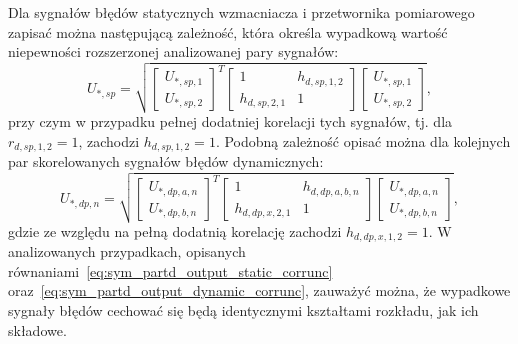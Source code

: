 Dla sygnałów błędów statycznych wzmacniacza i przetwornika pomiarowego zapisać można następującą zależność, która określa wypadkową wartość niepewności rozszerzonej analizowanej pary sygnałów:
\begin{equation}
U_{*,sp} = \sqrt{
\begin{bmatrix}
U_{*,sp,1} \\ U_{*,sp,2}
\end{bmatrix}^{T}
\begin{bmatrix}
1 & h_{d,sp,1,2} \\
h_{d,sp,2,1} & 1
\end{bmatrix}
\begin{bmatrix}
U_{*,sp,1} \\ U_{*,sp,2}
\end{bmatrix}}
\label{eq:sym_partd_output_static_corrunc},
\end{equation}
przy czym w przypadku pełnej dodatniej korelacji tych sygnałów, tj. dla $r_{d,sp,1,2} = 1$, zachodzi $h_{d,sp,1,2} = 1$. Podobną zależność opisać można dla kolejnych par skorelowanych sygnałów błędów dynamicznych:
\begin{equation}
U_{*,dp,n} = \sqrt{
\begin{bmatrix}
U_{*,dp,a,n} \\ U_{*,dp,b,n}
\end{bmatrix}^{T}
\begin{bmatrix}
1 & h_{d,dp,a,b,n} \\
h_{d,dp,x,2,1} & 1
\end{bmatrix}
\begin{bmatrix}
U_{*,dp,a,n} \\ U_{*,dp,b,n}
\end{bmatrix}}
\label{eq:sym_partd_output_dynamic_corrunc},
\end{equation}
gdzie ze względu na pełną dodatnią korelację zachodzi $h_{d,dp,x,1,2} = 1$. W analizowanych przypadkach, opisanych równaniami~\eqref{eq:sym_partd_output_static_corrunc} oraz~\eqref{eq:sym_partd_output_dynamic_corrunc}, zauważyć można, że wypadkowe sygnały błędów cechować się będą identycznymi kształtami rozkładu, jak ich składowe.


